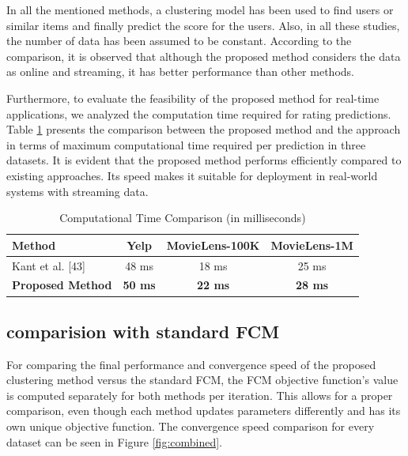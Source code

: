 \documentclass{article}
\begin{document}
In all the mentioned methods, a clustering model has been used to find users or similar items and finally predict the score for the users. Also, in all these studies, the number of data has been assumed to be constant. According to the comparison, it is observed that although the proposed method considers the data as online and streaming, it has better performance than other methods.

Furthermore, to evaluate the feasibility of the proposed method for real-time applications, we analyzed the computation time required for rating predictions. Table \ref{tab:computation_time} presents the comparison between the proposed method and the approach \cite{kant2017leaderrank} in terms of maximum computational time required per prediction in three datasets. It is evident that the proposed method performs efficiently compared to existing approaches. Its speed makes it suitable for deployment in real-world systems with streaming data.

\begin{table}[h]
\centering
\caption{Computational Time Comparison (in milliseconds)}
\label{tab:computation_time}
\renewcommand{\arraystretch}{1.3}
\begin{tabular}{lccc}
    \hline
    \textbf{Method} & \textbf{Yelp} & \textbf{MovieLens-100K} & \textbf{MovieLens-1M} \\
    \hline
    Kant et al. [43] & 48 ms & 18 ms & 25 ms \\
    \textbf{Proposed Method} & \textbf{50 ms} & \textbf{22 ms} & \textbf{28 ms} \\
    \hline
\end{tabular}
\end{table}

\subsection{comparision with standard FCM}

For comparing the final performance and convergence speed of the proposed clustering method versus the standard FCM, the FCM objective function's value is computed separately for both methods per iteration. This allows for a proper comparison, even though each method updates parameters differently and has its own unique objective function. The convergence speed comparison for every dataset can be seen in Figure \ref{fig:combined}.
\end{document}

